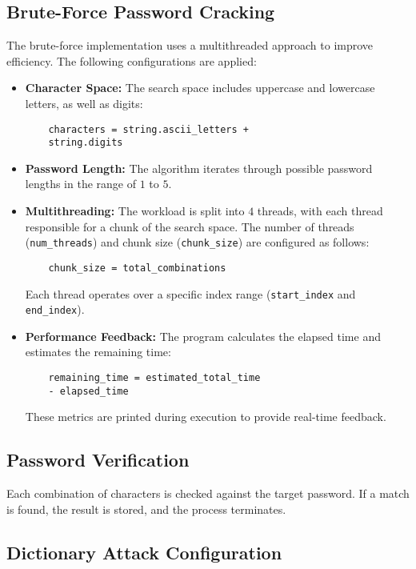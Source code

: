 \documentclass{comjnl}
\begin{document}
\subsection*{Brute-Force Password Cracking}
The brute-force implementation uses a multithreaded approach to improve efficiency. The following configurations are applied:
\begin{itemize}
    \item \textbf{Character Space:} The search space includes uppercase and lowercase letters, as well as digits:
    \begin{verbatim}
    characters = string.ascii_letters + 
    string.digits
    \end{verbatim}
    \item \textbf{Password Length:} The algorithm iterates through possible password lengths in the range of $1$ to $5$.
    \item \textbf{Multithreading:} The workload is split into $4$ threads, with each thread responsible for a chunk of the search space. The number of threads (\texttt{num\_threads}) and chunk size (\texttt{chunk\_size}) are configured as follows:
    \begin{verbatim}
    chunk_size = total_combinations
    \end{verbatim}
    Each thread operates over a specific index range (\texttt{start\_index} and \texttt{end\_index}).
    \item \textbf{Performance Feedback:} The program calculates the elapsed time and estimates the remaining time:
    \begin{verbatim}
    remaining_time = estimated_total_time 
    - elapsed_time
    \end{verbatim}
    These metrics are printed during execution to provide real-time feedback.
\end{itemize}

\subsection{Password Verification}
Each combination of characters is checked against the target password. If a match is found, the result is stored, and the process terminates.

\subsection{Dictionary Attack Configuration}
\end{document}
